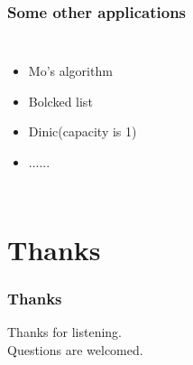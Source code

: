 \documentclass[landscape]{beamer}
\begin{document}
	\begin{frame}[c]\frametitle{Some other applications}
		\begin{columns}
			\column{4cm}
			\beamerdefaultoverlayspecification{<+->}
			\begin{itemize}
				\item Mo's algorithm
				\item Bolcked list
				\item Dinic(capacity is 1)
				\item ......
			\end{itemize}
			\column{7cm}
		\end{columns}
	\end{frame}
	\section{Thanks}
	\begin{frame}
		\frametitle{Thanks}
		Thanks for listening.\\
		Questions are welcomed.
	\end{frame}
\end{document}
